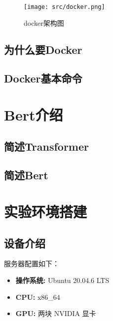 \documentclass[UTF8]{ctexart}
\begin{document}
\begin{figure}[H]
    \centering
    \texttt{[image: src/docker.png]}
    \caption{docker架构图}
\end{figure}


\subsection{为什么要Docker} %

\subsection{Docker基本命令} %

\section{Bert介绍} %

\subsection{简述Transformer} %

\subsection{简述Bert} %

\section{实验环境搭建} 

\subsection{设备介绍}

服务器配置如下：

\begin{itemize}
    \item \textbf{操作系统:} Ubuntu 20.04.6 LTS
        \footnotemark[1]
    \item \textbf{CPU:} x86\_64
        \footnotemark[2]
    \item \textbf{GPU:} 两块 NVIDIA 显卡
\end{itemize}
\end{document}
